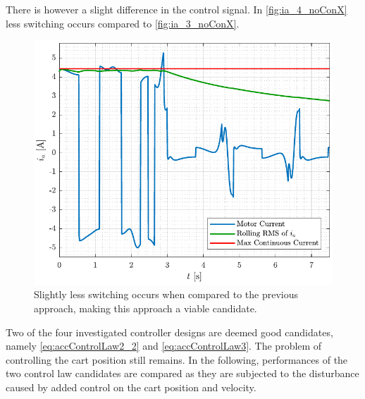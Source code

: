 %
There is however a slight difference in the control signal. In \autoref{fig:ia_4_noConX} less switching occurs compared to \autoref{fig:ia_3_noConX}. 
\begin{figure}[H]
  \includegraphics[width=.52\textwidth]{figures/ia_4_noConX}
  \caption{Slightly less switching occurs when compared to the previous approach, making this approach a viable candidate.}
  \label{fig:ia_4_noConX}
\end{figure}
%
Two of the four investigated controller designs are deemed good candidates, namely \autoref{eq:accControlLaw2_2} and \autoref{eq:accControlLaw3}. The problem of controlling the cart position still remains. In the following, performances of the two control law candidates are compared as they are subjected to the disturbance caused by added control on the cart position and velocity.
%
%

